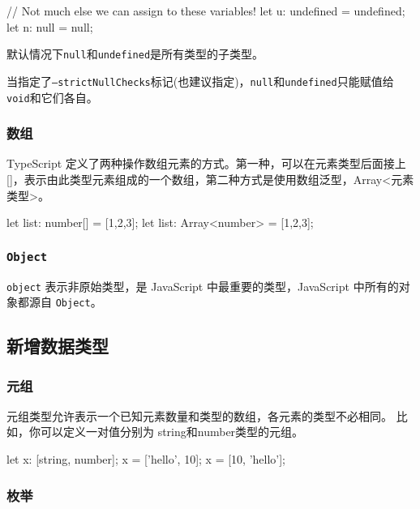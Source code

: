 \begin{TypeScript}
// Not much else we can assign to these variables!
let u: undefined = undefined;
let n: null = null;
\end{TypeScript}

默认情况下\texttt{null}和\texttt{undefined}是所有类型的子类型。

当指定了\texttt{--strictNullChecks}标记(也建议指定)，\texttt{null}和\texttt{undefined}只能赋值给\texttt{void}和它们各自。 





\subsubsection*{数组}

TypeScript 定义了两种操作数组元素的方式。第一种，可以在元素类型后面接上 []，表示由此类型元素组成的一个数组，第二种方式是使用数组泛型，Array<元素类型>。

\begin{TypeScript}
let list: number[] = [1,2,3];
let list: Array<number> = [1,2,3];
\end{TypeScript}

\subsubsection*{\texttt{Object}}

\texttt{object} 表示非原始类型，是 JavaScript 中最重要的类型，JavaScript 中所有的对象都源自 \texttt{Object}。

\subsection{新增数据类型}

\subsubsection*{元组}

元组类型允许表示一个已知元素数量和类型的数组，各元素的类型不必相同。 比如，你可以定义一对值分别为 string和number类型的元组。

\begin{TypeScript}
let x: [string, number];
x = ['hello', 10];
x = [10, 'hello'];
\end{TypeScript}

\subsubsection*{枚举}

